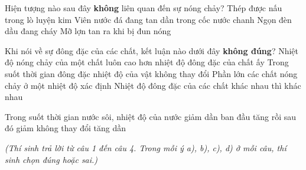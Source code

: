 \begin{ex}
	Hiện tượng nào sau đây \textbf{không} liên quan đến sự nóng chảy?
	\choice
	{Thép được nấu trong lò luyện kim}
	{Viên nước đá đang tan dần trong cốc nước chanh}
	{\True Ngọn đèn dầu đang cháy}
	{Mỡ lợn tan ra khi bị đun nóng}
\end{ex}

\begin{ex}
	Khi nói về sự đông đặc của các chất, kết luận nào dưới đây \textbf{không đúng}?
	\choice
	{\True Nhiệt độ nóng chảy của một chất luôn cao hơn nhiệt độ đông đặc của chất ấy}
	{Trong suốt thời gian đông đặc nhiệt độ của vật không thay đổi}
	{Phần lớn các chất nóng chảy ở một nhiệt độ xác định}
	{Nhiệt độ đông đặc của các chất khác nhau thì khác nhau}
\end{ex}

\begin{ex}
	Trong suốt thời gian nước sôi, nhiệt độ của nước
	\choice
	{giảm dần}
	{ban đầu tăng rồi sau đó giảm}
	{\True không thay đổi}
	{tăng dần}
\end{ex}

\vspace{0.15cm}
\begin{flushleft}
	{\color{blue!50!green}}
	\textit{\small (Thí sinh trả lời từ câu 1 đến câu 4. Trong mỗi ý a), b), c), d) ở mỗi câu, thí sinh chọn đúng hoặc sai.)}
\end{flushleft}
\setcounter{ex}{0}

